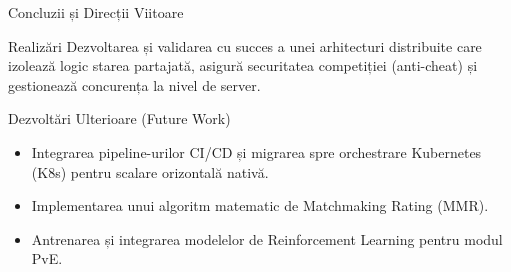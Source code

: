 \documentclass[10pt, aspectratio=169]{beamer}
\begin{document}
\begin{frame}{Concluzii și Direcții Viitoare}
    \begin{block}{Realizări}
        Dezvoltarea și validarea cu succes a unei arhitecturi distribuite care izolează logic starea partajată, asigură securitatea competiției (anti-cheat) și gestionează concurența la nivel de server.
    \end{block}

    \begin{block}{Dezvoltări Ulterioare (Future Work)}
        \begin{itemize}
            \item Integrarea pipeline-urilor CI/CD și migrarea spre orchestrare Kubernetes (K8s) pentru scalare orizontală nativă.
            \item Implementarea unui algoritm matematic de Matchmaking Rating (MMR).
            \item Antrenarea și integrarea modelelor de Reinforcement Learning pentru modul PvE.
        \end{itemize}
    \end{block}
\end{frame}
\end{document}
